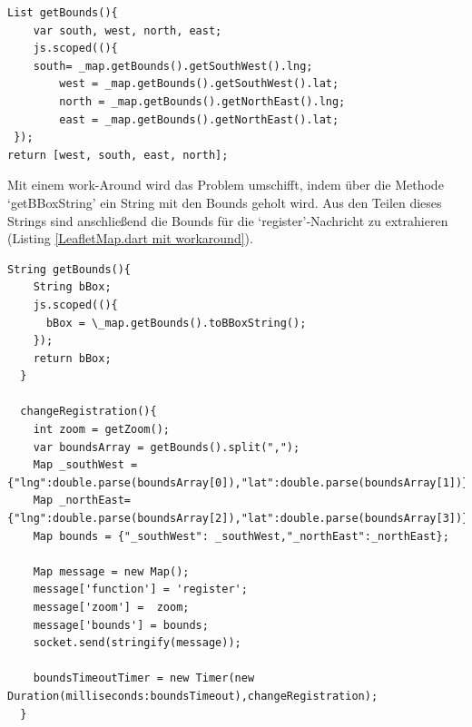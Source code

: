 \begin{lstlisting}[caption= LeafletMap.dart, label= LeafletMap.dart]
  List getBounds(){
    var south, west, north, east;
    js.scoped((){
    south= _map.getBounds().getSouthWest().lng;
        west = _map.getBounds().getSouthWest().lat;
        north = _map.getBounds().getNorthEast().lng;
        east = _map.getBounds().getNorthEast().lat;
 });
return [west, south, east, north];
\end{lstlisting}
Mit einem work-Around wird das Problem umschifft, indem über die Methode ‘getBBoxString’ ein String mit den Bounds geholt wird. Aus den Teilen dieses Strings sind anschließend die Bounds für die ‘register’-Nachricht zu extrahieren (Listing \ref{LeafletMap.dart mit workaround}).
\begin{lstlisting}[caption= LeafletMap.dart mit workaround, label= LeafletMap.dart mit workaround]
String getBounds(){
    String bBox;
    js.scoped((){
      bBox = \_map.getBounds().toBBoxString();
    });
    return bBox;
  }
  
  changeRegistration(){
    int zoom = getZoom();
    var boundsArray = getBounds().split(",");
    Map _southWest = {"lng":double.parse(boundsArray[0]),"lat":double.parse(boundsArray[1])};
    Map _northEast= {"lng":double.parse(boundsArray[2]),"lat":double.parse(boundsArray[3])};
    Map bounds = {"_southWest": _southWest,"_northEast":_northEast};

    Map message = new Map();
    message['function'] = 'register';
    message['zoom'] =  zoom;
    message['bounds'] = bounds;
    socket.send(stringify(message));
    
    boundsTimeoutTimer = new Timer(new Duration(milliseconds:boundsTimeout),changeRegistration);  
  }
\end{lstlisting}

